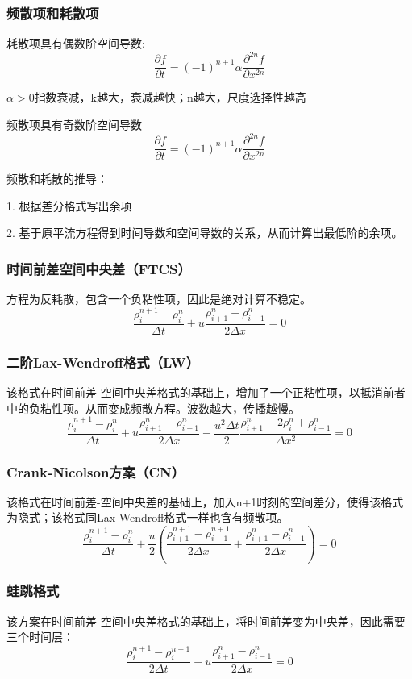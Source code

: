 \documentclass{article}
\begin{document}
\subsubsection{频散项和耗散项}
耗散项具有偶数阶空间导数:
$$\frac{\partial f}{\partial t} = (-1)^{n+1}\alpha\frac{\partial^{2n} f}{\partial x^{2n}}$$

$\alpha>0$指数衰减，k越大，衰减越快；n越大，尺度选择性越高

频散项具有奇数阶空间导数
$$\frac{\partial f}{\partial t} = (-1)^{n+1}\alpha\frac{\partial^{2n} f}{\partial x^{2n}}$$

频散和耗散的推导：

1. 根据差分格式写出余项

2. 基于原平流方程得到时间导数和空间导数的关系，从而计算出最低阶的余项。

\subsubsection{时间前差空间中央差（FTCS）}
方程为反耗散，包含一个负粘性项，因此是绝对计算不稳定。
$$\frac{\rho^{n+1}_{i}-\rho^{n}_{i}}{\Delta t} + u \frac{\rho^{n}_{i+1} - \rho^{n}_{i-1}}{2 \Delta x} = 0$$

\subsubsection{二阶Lax-Wendroff格式（LW）}
该格式在时间前差-空间中央差格式的基础上，增加了一个正粘性项，以抵消前者中的负粘性项。从而变成频散方程。波数越大，传播越慢。
$$\frac{\rho^{n+1}_{i}-\rho^{n}_{i}}{\Delta t} + u \frac{\rho^{n}_{i+1} - \rho^{n}_{i-1}}{2 \Delta x} - \frac{u^2 \Delta t}{2} \frac{\rho ^n_{i+1}-2\rho^n_i+\rho^n_{i-1}}{\Delta x^2}= 0$$

\subsubsection{Crank-Nicolson方案（CN）}
该格式在时间前差-空间中央差的基础上，加入n+1时刻的空间差分，使得该格式为隐式；该格式同Lax-Wendroff格式一样也含有频散项。
$$\frac{\rho^{n+1}_{i}-\rho^{n}_{i}}{\Delta t} + \frac{u}{2}\left( \frac{\rho^{n+1}_{i+1} - \rho^{n+1}_{i-1}}{2 \Delta x}+\frac{\rho^{n}_{i+1} - \rho^{n}_{i-1}}{2 \Delta x}\right)= 0$$

\subsubsection{蛙跳格式}
该方案在时间前差-空间中央差格式的基础上，将时间前差变为中央差，因此需要三个时间层：
$$\frac{\rho^{n+1}_i-\rho^{n-1}_i}{2\Delta t} + u\frac{\rho^{n}_{i+1}-\rho^{n}_{i-1}}{2\Delta x}=0$$
\end{document}
